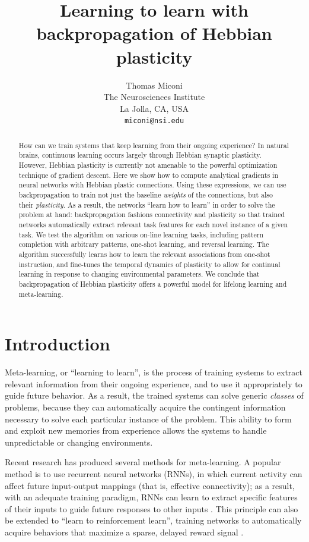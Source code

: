 \documentclass{article}
\title{Learning to learn with backpropagation of Hebbian plasticity}
\author{
    Thomas Miconi\\
    The Neurosciences Institute\\
    La Jolla, CA, USA\\
    \texttt{miconi@nsi.edu}
}
\begin{document}
\maketitle

\begin{abstract} 

How can we train systems that keep learning from their ongoing experience?  In
natural brains, continuous learning occurs largely through 
Hebbian synaptic plasticity.  However, Hebbian plasticity is
currently not amenable to the powerful optimization technique of gradient
descent. Here we show how to compute analytical gradients in neural networks
with Hebbian plastic connections. Using these expressions, we can use
backpropagation to train not just the baseline \emph{weights} of the
connections, but also their \emph{plasticity}. As a result, the networks
``learn how to learn''  in order to solve the problem at hand: backpropagation
fashions connectivity and plasticity so that trained networks automatically
extract relevant task features for each novel instance of a given task.  We
test the algorithm on various on-line learning tasks, including pattern
completion with arbitrary patterns, one-shot learning, and reversal learning.
The algorithm successfully learns how to learn the relevant associations from
one-shot instruction, and fine-tunes the temporal dynamics of plasticity to
allow for continual learning in response to changing environmental parameters.
We conclude that backpropagation of Hebbian plasticity offers a powerful model
for lifelong learning and meta-learning.

\end{abstract}


\section{Introduction}

Meta-learning, or ``learning to learn'', is the process of training systems to
extract relevant information from their ongoing experience, and to use it
appropriately to guide future behavior. As a result, the trained systems can
solve generic \emph{classes} of problems, because they can automatically acquire
the contingent information necessary to solve each particular instance of the problem.
This ability to form and exploit new memories from experience allows the
systems to handle unpredictable or changing environments.

Recent research has produced several methods for meta-learning. A popular
method is to use recurrent neural networks (RNNs), in which current activity
can affect future input-output mappings (that is, effective connectivity); as a
result, with an adequate training paradigm, RNNs can learn to extract specific
features of their inputs to guide future responses to other inputs \cite{hochreiter2001learning}.
This principle can also be extended to ``learn to reinforcement
learn'', training networks to automatically acquire behaviors that maximize a
sparse, delayed reward signal \cite{duan2016rl2,wang2016learning}.
\end{document}

